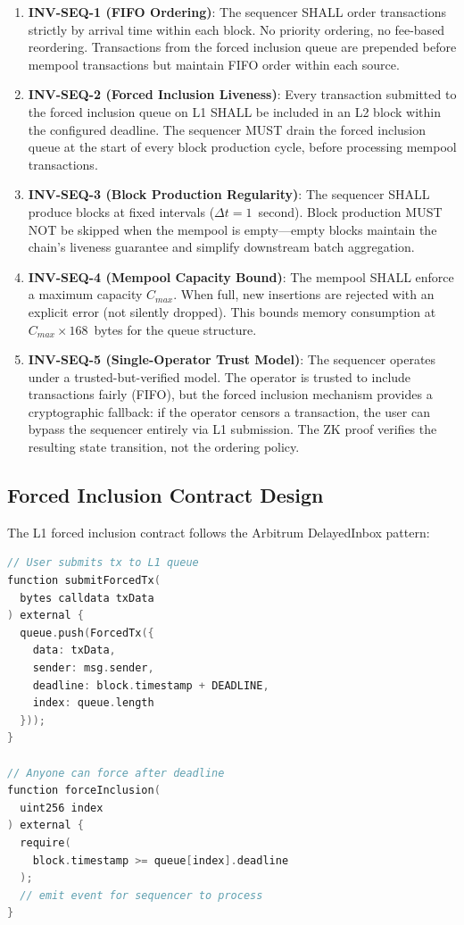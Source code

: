\begin{enumerate}
  \item \textbf{INV-SEQ-1 (FIFO Ordering)}: The sequencer SHALL order transactions
    strictly by arrival time within each block. No priority ordering, no fee-based
    reordering. Transactions from the forced inclusion queue are prepended before
    mempool transactions but maintain FIFO order within each source.

  \item \textbf{INV-SEQ-2 (Forced Inclusion Liveness)}: Every transaction submitted
    to the forced inclusion queue on L1 SHALL be included in an L2 block within
    the configured deadline. The sequencer MUST drain the forced inclusion queue at
    the start of every block production cycle, before processing mempool transactions.

  \item \textbf{INV-SEQ-3 (Block Production Regularity)}: The sequencer SHALL produce
    blocks at fixed intervals ($\Delta t = 1$~second). Block production MUST NOT be
    skipped when the mempool is empty---empty blocks maintain the chain's liveness
    guarantee and simplify downstream batch aggregation.

  \item \textbf{INV-SEQ-4 (Mempool Capacity Bound)}: The mempool SHALL enforce a
    maximum capacity $C_{max}$. When full, new insertions are rejected with an
    explicit error (not silently dropped). This bounds memory consumption at
    $C_{max} \times 168$~bytes for the queue structure.

  \item \textbf{INV-SEQ-5 (Single-Operator Trust Model)}: The sequencer operates under
    a trusted-but-verified model. The operator is trusted to include transactions
    fairly (FIFO), but the forced inclusion mechanism provides a cryptographic
    fallback: if the operator censors a transaction, the user can bypass the sequencer
    entirely via L1 submission. The ZK proof verifies the resulting state transition,
    not the ordering policy.
\end{enumerate}

\subsection{Forced Inclusion Contract Design}

The L1 forced inclusion contract follows the Arbitrum DelayedInbox pattern:

\begin{lstlisting}[language=Go, caption={Forced Inclusion L1 Contract Interface (Solidity-like pseudocode)}, label={lst:forced-contract}]
// User submits tx to L1 queue
function submitForcedTx(
  bytes calldata txData
) external {
  queue.push(ForcedTx({
    data: txData,
    sender: msg.sender,
    deadline: block.timestamp + DEADLINE,
    index: queue.length
  }));
}

// Anyone can force after deadline
function forceInclusion(
  uint256 index
) external {
  require(
    block.timestamp >= queue[index].deadline
  );
  // emit event for sequencer to process
}
\end{lstlisting}

